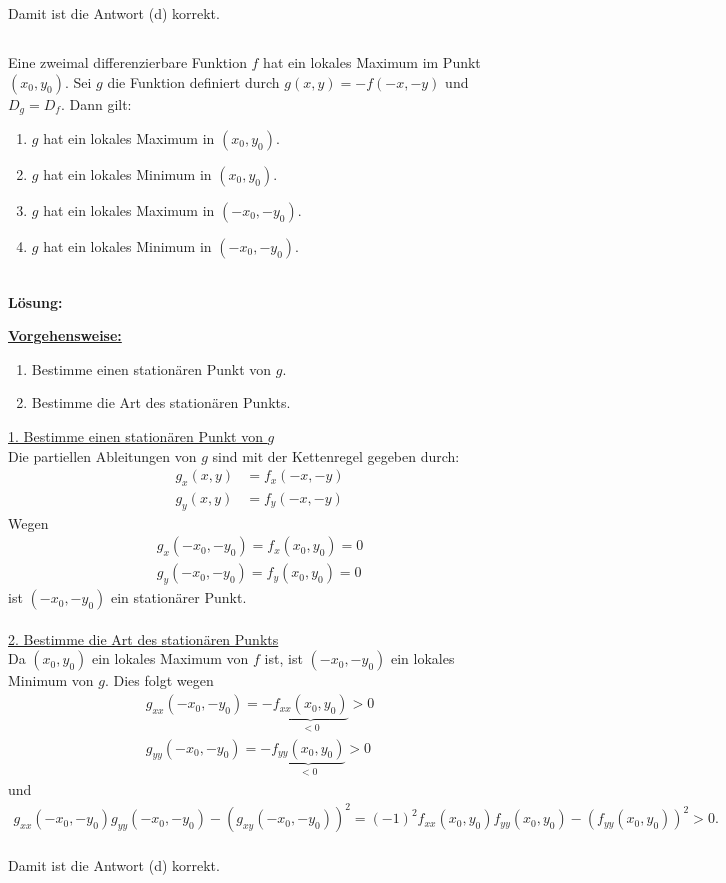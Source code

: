 Damit ist die Antwort (d) korrekt.
\newpage

\subsection*{}
Eine zweimal differenzierbare Funktion $ f  $ hat ein lokales Maximum im Punkt $ (x_0,y_0) $.
Sei $ g  $ die Funktion definiert durch $ g(x,y) = - f(-x,-y)  $ und $ D_g = D_f $. Dann gilt:

\renewcommand{\labelenumi}{(\alph{enumi})}
\begin{enumerate}
	\item $ g $ hat ein lokales Maximum in $ (x_0,y_0) $.
	\item $ g $ hat ein lokales Minimum in $ (x_0,y_0) $.
	\item
	$ g $ hat ein lokales Maximum in $ (-x_0,-y_0) $.
	\item
	$ g $ hat ein lokales Minimum in $ (-x_0,-y_0) $.
\end{enumerate}
\ \\
\textbf{Lösung:}
\begin{mdframed}
	\underline{\textbf{Vorgehensweise:}}
	\renewcommand{\labelenumi}{\theenumi.}
	\begin{enumerate}
		\item Bestimme einen stationären Punkt von $ g $.
		\item Bestimme die Art des stationären Punkts.
	\end{enumerate}
\end{mdframed}
\underline{1. Bestimme einen stationären Punkt von $ g $}\\
Die partiellen Ableitungen von $ g $ sind mit der Kettenregel gegeben durch:
\begin{align*}
g_x(x,y) &=  f_x(-x,-y)\\
g_y(x,y) &=  f_y(-x,-y)
\end{align*}
Wegen 
\begin{align*}
g_x(-x_0,-y_0) = f_x(x_0,y_0) = 0\\
g_y(-x_0,-y_0) = f_y(x_0,y_0) = 0
\end{align*}
ist $ (-x_0,-y_0) $ ein stationärer Punkt.\\
\\
\underline{2. Bestimme die Art des stationären Punkts}\\
Da $ (x_0,y_0)  $ ein lokales Maximum von $ f $ ist, ist $ (-x_0,-y_0) $ ein lokales Minimum  von $ g $.
Dies folgt wegen
\begin{align*}
g_{xx}(-x_0,-y_0) =  - \underbrace{f_{xx}(x_0,y_0)}_{< 0 } > 0\\
g_{yy}(-x_0,-y_0) =  - \underbrace{f_{yy}(x_0,y_0)}_{< 0 } > 0
\end{align*}
und
\begin{align*}
g_{xx}(-x_0,-y_0) g_{yy}(-x_0,-y_0) - (g_{xy}(-x_0,-y_0))^2
=
(-1)^2f_{xx}(x_0,y_0)f_{yy}(x_0,y_0) - (f_{yy}(x_0,y_0))^2 > 0. 
\end{align*}
\ \\
Damit ist die Antwort (d) korrekt.
\newpage

